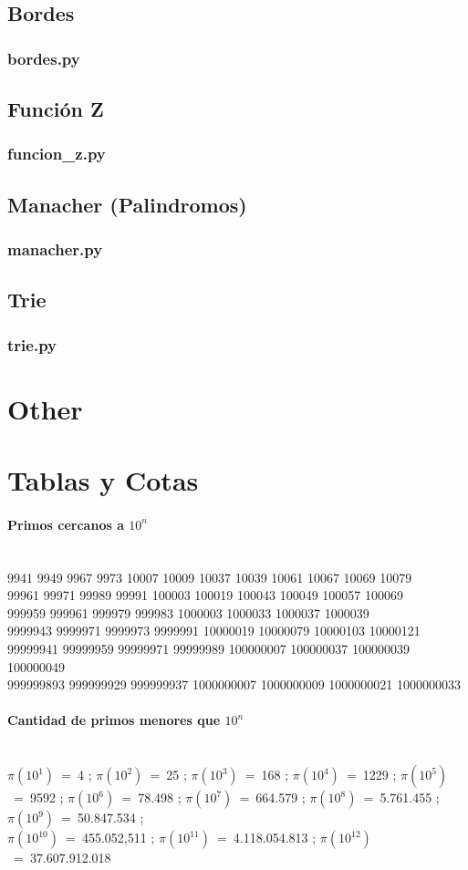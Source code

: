 \documentclass{article}
\newcommand\codefile[2]{    
    \subsubsection{#2}
    
    
}
\begin{document}
\begin{multicols*}{2}
\subsection{Bordes}
\codefile{strings/bordes.py}{bordes.py}

\subsection{Función Z}
\codefile{strings/funcion_z.py}{funcion\_z.py}

\subsection{Manacher (Palindromos)}
\codefile{strings/manacher.py}{manacher.py}

\subsection{Trie}
\codefile{strings/trie.py}{trie.py}

\section{Other}

\section{Tablas y Cotas}
\paragraph{Primos cercanos a $10^n$}\ \\
9941 9949 9967 9973 10007 10009 10037 10039 10061 10067 10069 10079\\
99961 99971 99989 99991 100003 100019 100043 100049 100057 100069\\
999959 999961 999979 999983 1000003 1000033 1000037 1000039\\
9999943 9999971 9999973 9999991 10000019 10000079 10000103 10000121\\
99999941 99999959 99999971 99999989 100000007 100000037 100000039 100000049\\
999999893 999999929 999999937 1000000007 1000000009 1000000021 1000000033

\paragraph{Cantidad de primos menores que $10^n$}\ \\
$\pi(10^1)$~=~4 ;
$\pi(10^2)$~=~25 ;
$\pi(10^3)$~=~168 ;
$\pi(10^4)$~=~1229 ;
$\pi(10^5)$~=~9592 ;
$\pi(10^6)$~=~78.498 ;
$\pi(10^7)$~=~664.579 ;
$\pi(10^8)$~=~5.761.455 ;
$\pi(10^9)$~=~50.847.534 ;\\
$\pi(10^{10})$~=~455.052,511 ;
$\pi(10^{11})$~=~4.118.054.813 ;
$\pi(10^{12})$~=~37.607.912.018
%
%
%

\end{multicols*}
\end{document}
